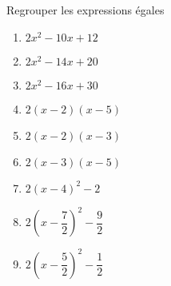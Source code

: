 \documentclass[a4paper,11pt,exos]{nsi} %
\begin{document}
\exo{}
\textcolor{UGLiBlue}{
Regrouper les expressions égales
\begin{multicols}{3}
	\begin{enumerate}[label=\textbullet]
		\item 	$2x^2-10x+12$
		\item 	$2x^2-14x+20$
		\item 	$2x^2-16x+30$
	\columnbreak
		\item 	$2(x-2)(x-5)$
		\item 	$2(x-2)(x-3)$
		\item 	$2(x-3)(x-5)$
	\columnbreak
		\item	$2\left(x-4\right)^2-2$
		\item	$2\left(x-\dfrac{7}{2}\right)^2-\dfrac{9}{2}$
		\item 	$2\left(x-\dfrac{5}{2}\right)^2-\dfrac{1}{2}$
	\end{enumerate}
\end{multicols}}
\end{document}
